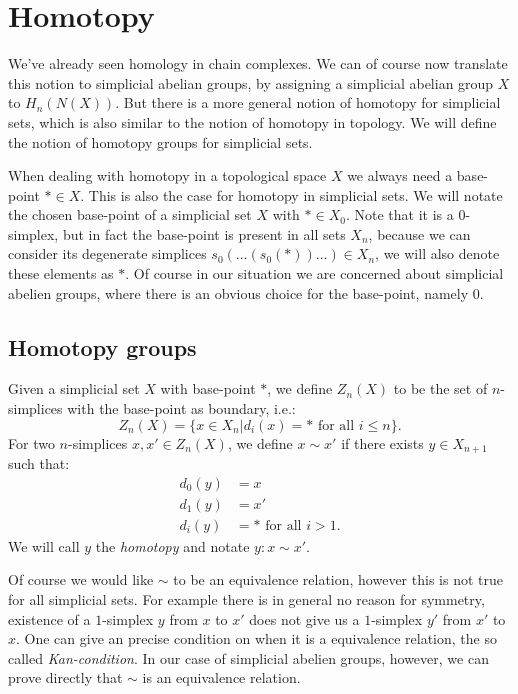 \section{Homotopy}
\label{sec:Homotopy}

We've already seen homology in chain complexes. We can of course now translate this notion to simplicial abelian groups, by assigning a simplicial abelian group $X$ to $H_n(N(X))$. But there is a more general notion of homotopy for simplicial sets, which is also similar to the notion of homotopy in topology. We will define the notion of homotopy groups for simplicial sets.

When dealing with homotopy in a topological space $X$ we always need a base-point $\ast \in X$. This is also the case for homotopy in simplicial sets. We will notate the chosen base-point of a simplicial set $X$ with $\ast \in X_0$. Note that it is a $0$-simplex, but in fact the base-point is present in all sets $X_n$, because we can consider its degenerate simplices $s_0(\ldots(s_0(\ast))\ldots) \in X_n$, we will also denote these elements as $\ast$. Of course in our situation we are concerned about simplicial abelien groups, where there is an obvious choice for the base-point, namely $0$.

\subsection{Homotopy groups}
\begin{definition}
	Given a simplicial set $X$ with base-point $\ast$, we define $Z_n(X)$ to be the set of $n$-simplices with the base-point as boundary, i.e.:
	$$ Z_n(X) = \{ x \in X_n | d_i(x) = \ast \text{ for all } i \leq n \}. $$
	For two $n$-simplices $x, x' \in Z_n(X)$, we define $x \sim x'$ if there exists $y \in X_{n+1}$ such that:
	\begin{align}
		d_0(y) &= x \\
		d_1(y) &= x' \\
		d_i(y) &= \ast \text{ for all } i > 1.
	\end{align}
	We will call $y$ the \emph{homotopy} and notate $y: x \sim x'$.
\end{definition}

Of course we would like $\sim$ to be an equivalence relation, however this is not true for all simplicial sets. For example there is in general no reason for symmetry, existence of a $1$-simplex $y$ from $x$ to $x'$ does not give us a $1$-simplex $y'$ from $x'$ to $x$. One can give an precise condition on when it is a equivalence relation, the so called \emph{Kan-condition}. In our case of simplicial abelien groups, however, we can prove directly that $\sim$ is an equivalence relation.

